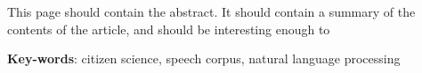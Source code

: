 
\setlength{\absparsep}{18pt} %
\begin{resumo}
    This page should contain the abstract. It should contain a summary of the contents of the article, and should be interesting enough to  
	\vspace{\onelineskip}
	\noindent 
	
	\textbf{Key-words}: citizen science, speech corpus, natural language processing
\end{resumo}
